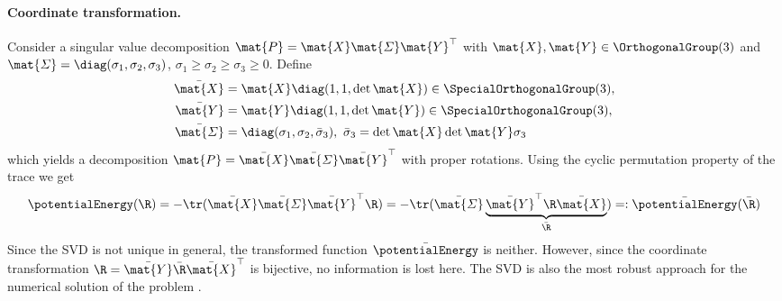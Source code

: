\paragraph{Coordinate transformation.}
Consider a singular value decomposition $\mat{P} = \mat{X} \mat{\varSigma} \mat{Y}^\top$ with $\mat{X}, \mat{Y} \in \OrthogonalGroup(3)$ and $\mat{\varSigma} = \diag(\sigma_1, \sigma_2, \sigma_3)$, $\sigma_1 \geq \sigma_2 \geq \sigma_3 \geq 0$.
Define 
\begin{subequations}
\begin{align}
 \bar{\mat{X}} &= \mat{X} \diag(1, 1, \det\mat{X}) \in \SpecialOrthogonalGroup(3),
\\
 \bar{\mat{Y}} &= \mat{Y} \diag(1, 1, \det\mat{Y}) \in \SpecialOrthogonalGroup(3),
\\
 \bar{\mat{\varSigma}} &= \diag(\sigma_1, \sigma_2, \bar{\sigma}_3), \ \bar{\sigma}_3 = \det\mat{X}\det\mat{Y} \sigma_3
\end{align} 
\end{subequations}
which yields a decomposition $\mat{P} = \bar{\mat{X}} \bar{\mat{\varSigma}} \bar{\mat{Y}}^\top$ with proper rotations.
Using the cyclic permutation property of the trace we get
\begin{align}
 \potentialEnergy(\R) = -\tr( \bar{\mat{X}} \bar{\mat{\varSigma}} \bar{\mat{Y}}^\top \R) = -\tr( \bar{\mat{\varSigma}} \underbrace{\bar{\mat{Y}}^\top \R \bar{\mat{X}}}_{\bar{\R}}) =: \bar{\potentialEnergy}(\bar{\R})
\end{align}
Since the SVD is not unique in general, the transformed function $\bar{\potentialEnergy}$ is neither.
However, since the coordinate transformation $\R = \bar{\mat{Y}} \bar{\R} \bar{\mat{X}}^\top$ is bijective, no information is lost here.
The SVD is also the most robust approach for the numerical solution of the problem \cite{Markley:Wahba}.

